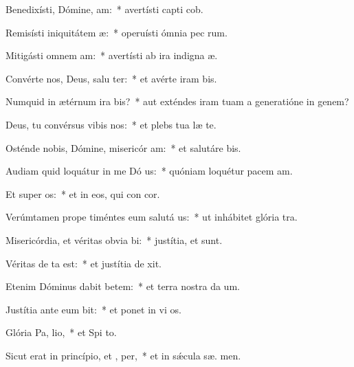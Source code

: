 \item Benedixísti, Dómine,  am:~* avertísti capti cob.
\item Remisísti iniquitátem  æ:~* operuísti ómnia pec rum.
\item Mitigásti omnem  am:~* avertísti ab ira indigna æ.
\item Convérte nos, Deus, salu ter:~* et avérte iram   bis.
\item Numquid in ætérnum ira bis?~* aut exténdes iram tuam a generatióne in genem?
\item Deus, tu convérsus vibis nos:~* et plebs tua læ  te.
\item Osténde nobis, Dómine, misericór am:~* et salutáre   bis.
\item Audiam quid loquátur in me Dó us:~* quóniam loquétur pacem   am.
\item Et super  os:~* et in eos, qui con  cor.
\item Verúmtamen prope timéntes eum salutá us:~* ut inhábitet glória   tra.
\item Misericórdia, et véritas obvia bi:~* justítia, et   sunt.
\item Véritas de  ta est:~* et justítia de  xit.
\item Etenim Dóminus dabit betem:~* et terra nostra da  um.
\item Justítia ante eum bit:~* et ponet in vi  os.
\item Glória Pa,  lio,~* et Spi to.
\item Sicut erat in princípio, et ,  per,~* et in sǽcula sæ. men.
